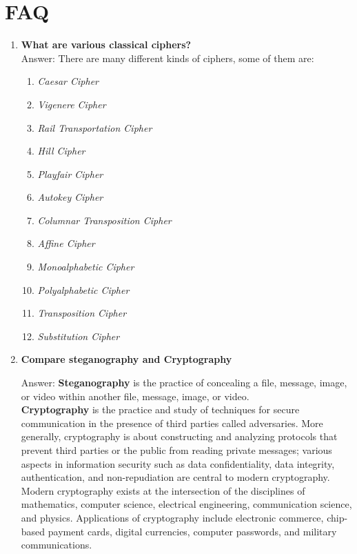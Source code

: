 \documentclass[11pt]{article}
\begin{document}
\section{FAQ}

\begin{enumerate}
	\item \textbf{What are various classical ciphers?}\\
	      Answer:
	      There are many different kinds of ciphers, some of them are:
	      \begin{enumerate}
		      \item \textit{Caesar Cipher}
		      \item  \textit{Vigenere Cipher}
		      \item  \textit{Rail Transportation Cipher}
		      \item  \textit{Hill Cipher}
		      \item  \textit{Playfair Cipher}
		      \item  \textit{Autokey Cipher}
		      \item  \textit{Columnar Transposition Cipher}
		      \item  \textit{Affine Cipher}
		      \item  \textit{Monoalphabetic Cipher}
		      \item  \textit{Polyalphabetic Cipher}
		      \item  \textit{Transposition Cipher}
		      \item  \textit{Substitution Cipher}
	      \end{enumerate}

	\item \textbf{Compare steganography and Cryptography}

	      Answer: \textbf{Steganography} is the practice of concealing a file, message, image, or video within another file, message, image, or video.\\

	      \textbf{Cryptography} is the practice and study of techniques for secure communication in the presence of third parties called adversaries. More generally, cryptography is about constructing and analyzing protocols that prevent third parties or the public from reading private messages; various aspects in information security such as data confidentiality, data integrity, authentication, and non-repudiation are central to modern cryptography. Modern cryptography exists at the intersection of the disciplines of mathematics, computer science, electrical engineering, communication science, and physics. Applications of cryptography include electronic commerce, chip-based payment cards, digital currencies, computer passwords, and military communications.\\


\end{enumerate}
\end{document}
